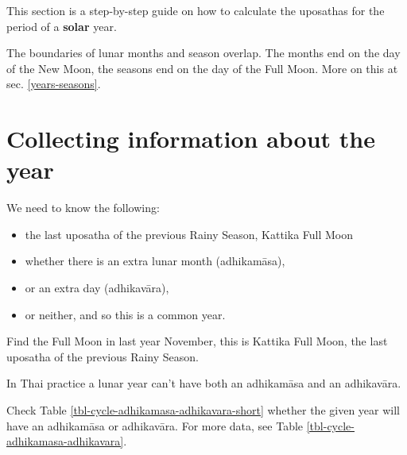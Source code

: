 \documentclass[11pt,oneside]{memoir-article}
\begin{document}
This section is a step-by-step guide on how to calculate the uposathas for the
period of a \textbf{solar} year.

The boundaries of lunar months and season overlap. The months end on the day of
the New Moon, the seasons end on the day of the Full Moon. More on this at sec.
\ref{years-seasons}.

\section{Collecting information about the year}
\label{sec-1-1}

We need to know the following:

\begin{itemize}
\item the last uposatha of the previous Rainy Season, Kattika Full Moon
\item whether there is an extra lunar month (adhikamāsa),
\item or an extra day (adhikavāra),
\item or neither, and so this is a common year.
\end{itemize}

Find the Full Moon in last year November, this is Kattika Full Moon, the last
uposatha of the previous Rainy Season.

In Thai practice a lunar year can't have both an adhikamāsa and an adhikavāra.

Check Table \ref{tbl-cycle-adhikamasa-adhikavara-short} whether the given year
will have an adhikamāsa or adhikavāra. For more data, see Table
\ref{tbl-cycle-adhikamasa-adhikavara}.
\end{document}
